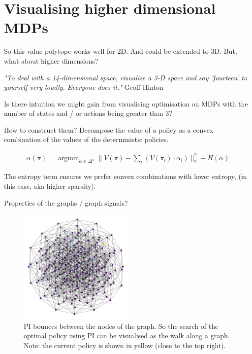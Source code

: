 \newpage
\section{Visualising higher dimensional MDPs}\label{graph-vis}

So this value polytope works well for 2D. And could be extended to 3D. But, what about higher dimensions?

\begin{displayquote}
  \textit{"To deal with a 14-dimensional space, visualize a 3-D space and say 'fourteen' to yourself very loudly. Everyone does it."} Geoff Hinton
\end{displayquote}

Is there intuition we might gain from visualising optimisation on MDPs with the
number of states and / or actions being greater than 3?

How to construct them? Decompose the value of a policy as a convex combination
of the values of the deterministic policies.

\begin{align*}
  \alpha(\pi) = \mathop{\text{argmin}}_{\alpha \in \Delta^n} \parallel  V(\pi) - \sum_i (V(\pi_i) \cdot \alpha_i ) \parallel_2^2 + H(\alpha)
\end{align*}

The entropy term ensures we prefer convex combinations with lower entropy, (in this case, aka higher sparsity).

Properties of the graphs / graph signals?

\begin{figure}[!h]
\centering
\includegraphics[width=0.5\textwidth,height=0.3\textheight]{../../pictures/figures/discrete-graph.png}
\caption{PI bounces between the nodes of the graph.
So the search of the optimal policy using PI can be visualised as the walk along a graph.
Note: the current policy is shown in yellow (close to the top right).}
\end{figure}

